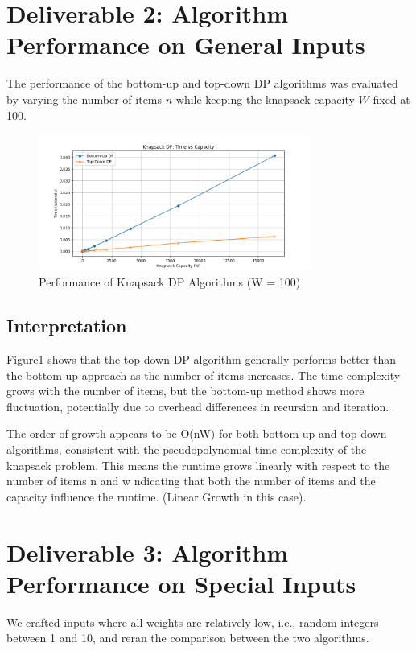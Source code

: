 \documentclass{article}
\begin{document}
\section{Deliverable 2: Algorithm Performance on General Inputs}
The performance of the bottom-up and top-down DP algorithms was evaluated by varying the number of items \(n\) while keeping the knapsack capacity \(W\) fixed at 100.

\begin{figure}[ht]
    \centering
    \includegraphics[width=0.8\textwidth]{../knapsack_time_vs_capacity.png}
    \caption{Performance of Knapsack DP Algorithms (W = 100)}\label{fig:performance_n}
\end{figure}

\subsection{Interpretation}
Figure\ref{fig:performance_n} shows that the top-down DP algorithm generally performs better than the bottom-up approach as the number of items increases. The time complexity grows with the number of items, but the bottom-up method shows more fluctuation, potentially due to overhead differences in recursion and iteration.

The order of growth appears to be O(nW) for both bottom-up and top-down algorithms, consistent with the pseudopolynomial time complexity of the knapsack problem. 
This means the runtime grows linearly with respect to the number of items n and w ndicating that both the number of items and the capacity influence the runtime. (Linear Growth in this case).

\section{Deliverable 3: Algorithm Performance on Special Inputs}
We crafted inputs where all weights are relatively low, i.e., random integers between 1 and 10, and reran the comparison between the two algorithms.
\end{document}
